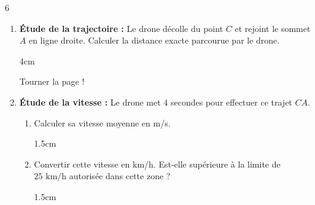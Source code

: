 \documentclass[a4paper]{book}
\begin{document}
{\begin{exerciceNote}{6}
\begin{center}
        \end{center}
        
        \begin{enumerate}[leftmargin=*]
            \item \textbf{Étude de la trajectoire :} Le drone décolle du point $C$ et rejoint le sommet $A$ en ligne droite. Calculer la distance exacte parcourue par le drone.

            \begin{ZoneReponse}{4cm}                
            \end{ZoneReponse}

\vfill

\hfill Tourner la page !

\newpage
            
            \item \textbf{Étude de la vitesse :} Le drone met $4$ secondes pour effectuer ce trajet $CA$. 
            \begin{enumerate}
                \item Calculer sa vitesse moyenne en m/s.
                \begin{ZoneReponse}{1.5cm}                
                \end{ZoneReponse}
                
                \item Convertir cette vitesse en km/h. Est-elle supérieure à la limite de $25\text{ km/h}$ autorisée dans cette zone ?
                \begin{ZoneReponse}{1.5cm}                
                \end{ZoneReponse}
            \end{enumerate}
        

\end{enumerate}
\end{exerciceNote}}
\end{document}
